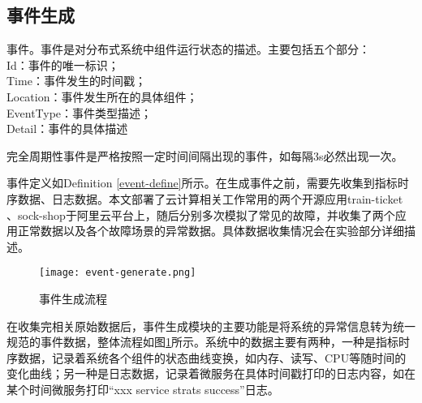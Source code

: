 \subsection{事件生成}\label{event-generate}
\begin{definition}[事件]
    \label{event-define}
    事件。事件是对分布式系统中组件运行状态的描述。主要包括五个部分：
    {\\\qquad
        Id：事件的唯一标识；\\
        Time：事件发生的时间戳；\\\qquad
        Location：事件发生所在的具体组件；\\\qquad
        EventType：事件类型描述；\\\qquad
        Detail：事件的具体描述\\\qquad
    }
\end{definition}

\begin{definition}[完全周期性事件]
    \label{periodic-event}
    完全周期性事件是严格按照一定时间间隔出现的事件，如每隔3s必然出现一次。
\end{definition}

事件定义如Definition \ref{event-define}所示。在生成事件之前，需要先收集到指标时序数据、日志数据。本文部署了云计算相关工作常用的两个开源应用train-ticket\cite{zhou2018poster} 、sock-shop\cite{rahman2019predicting}于阿里云平台上，随后分别多次模拟了常见的故障，并收集了两个应用正常数据以及各个故障场景的异常数据。具体数据收集情况会在实验部分详细描述。
\begin{figure}[htbp]
    \centering
    \texttt{[image: event-generate.png]}
    \caption{事件生成流程\label{event-generate}}
\end{figure}

在收集完相关原始数据后，事件生成模块的主要功能是将系统的异常信息转为统一规范的事件数据，整体流程如图\ref{event-generate}所示。系统中的数据主要有两种，一种是指标时序数据，记录着系统各个组件的状态曲线变换，如内存、读写、CPU等随时间的变化曲线；另一种是日志数据，记录着微服务在具体时间戳打印的日志内容，如在某个时间微服务打印“xxx service strats success”日志。

